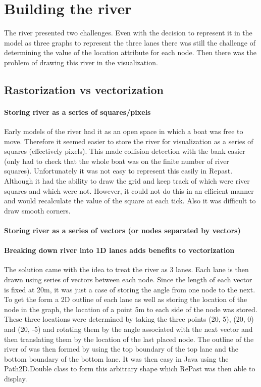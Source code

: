   \section{Building the river}\label{techissues:river}
    The river presented two challenges. Even with the decision to represent it in the model as three graphs to represent the three lanes there was still the challenge of determining the value of the location attribute for each node. Then there was the problem of drawing this river in the visualization.
    
    \subsection{Rastorization vs vectorization}
    
      \paragraph{Storing river as a series of squares/pixels}
      Early models of the river had it as an open space in which a boat was free to move. Therefore it seemed easier to store the river for visualization as a series of squares (effectively pixels). This made collision detection with the bank easier (only had to check that the whole boat was on the finite number of river squares). Unfortunately it was not easy to represent this easily in Repast. Although it had the ability to draw the grid and keep track of which were river squares and which were not. However, it could not do this in an efficient manner and would recalculate the value of the square at each tick. Also it was difficult to draw smooth corners.
      
      \paragraph{Storing river as a series of vectors (or nodes separated by vectors)}
      \paragraph{Breaking down river into 1D lanes adds benefits to vectorization}
      The solution came with the idea to treat the river as 3 lanes. Each lane is then drawn using series of vectors between each node. Since the length of each vector is fixed at 20m, it was just a case of storing the angle from one node to the next. To get the form a 2D outline of each lane as well as storing the location of the node in the graph, the location of a point 5m to each side of the node was stored. These three locations were determined by taking the three points (20, 5), (20, 0) and (20, -5) and rotating them by the angle associated with the next vector and then translating them by the location of the last placed node. The outline of the river of was then formed by using the top boundary of the top lane and the bottom boundary of the bottom lane. It was then easy in Java using the Path2D.Double class to form this arbitrary shape which RePast was then able to display.
      
